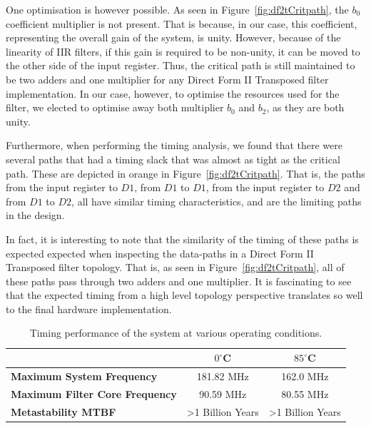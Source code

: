 \documentclass[]{article}
\begin{document}
One optimisation is however possible. As seen in Figure~\ref{fig:df2tCritpath}, the $b_0$ coefficient multiplier is not present. That is because, in our case, this coefficient, representing the overall gain of the system, is unity.
However, because of the linearity of IIR filters, if this gain is required to be non-unity, it can be moved to the other side of the input register.
Thus, the critical path is still maintained to be two adders and one multiplier for any Direct Form II Transposed filter implementation.
In our case, however, to optimise the resources used for the filter, we elected to optimise away both multiplier $b_0$ and $b_2$, as they are both unity.

Furthermore, when performing the timing analysis, we found that there were several paths that had a timing slack that was almost as tight as the critical path. These are depicted in orange in Figure~\ref{fig:df2tCritpath}. That is, the paths from the input register to $D1$, from $D1$ to $D1$, from the input register to $D2$ and from $D1$ to $D2$, all have similar timing characteristics, and are the limiting paths in the design.

In fact, it is interesting to note that the similarity of the timing of these paths is expected expected when inspecting the data-paths in a Direct Form II Transposed filter topology. That is, as seen in Figure~\ref{fig:df2tCritpath}, all of these paths pass through two adders and one multiplier.
It is fascinating to see that the expected timing from a high level topology perspective translates so well to the final hardware implementation.


\begin{table}[htbp]
	\caption{Timing performance of the system at various operating conditions.}
	\label{tab:fmax}
	\begin{center}
		\begin{tabular}{l|cc}
		\hline

		\hline
			 & $0^\circ$C & $85^\circ$C  \\
		\hline
			\textbf{Maximum System Frequency} 		& 181.82 MHz					& 162.0 MHz \\
		\hline
			\textbf{Maximum Filter Core Frequency}	& 90.59 MHz						& 80.55 MHz \\
		\hline
			\textbf{Metastability MTBF}				& \textgreater 1 Billion Years	& \textgreater 1 Billion Years \\
		\hline

		\hline
		\end{tabular}
	\end{center}
\end{table}
\end{document}
